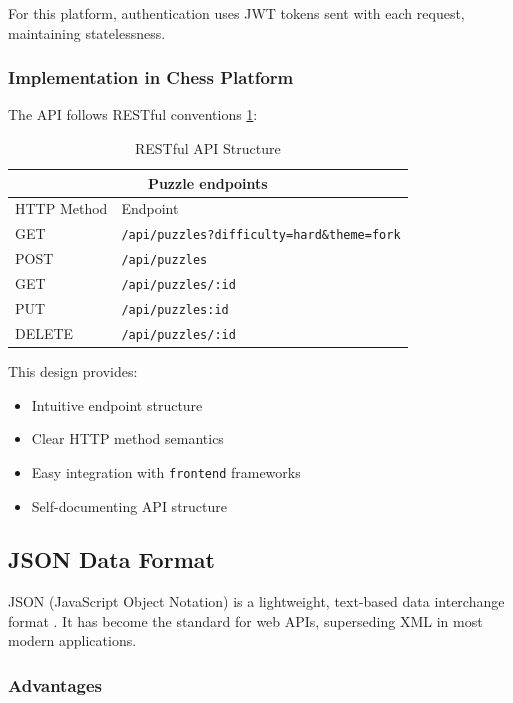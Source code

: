 For this platform, authentication uses JWT tokens sent with each request, maintaining statelessness.

\subsubsection*{Implementation in Chess Platform}

The API follows RESTful conventions \ref{table:ras}:
\begin{table}
    \begin{tabular}{|p{3cm}|p{9cm}|}
        \hline
        \multicolumn{2}{|c|}{Puzzle endpoints} \\
        \hline
        HTTP Method & Endpoint\\
        \hline
        \hline
        GET &  \texttt{/api/puzzles?difficulty=hard\&theme=fork} \\ \hline
        POST & \texttt{/api/puzzles} \\ \hline
        GET & \texttt{/api/puzzles/:id} \\ \hline
        PUT & \texttt{/api/puzzles:id} \\ \hline
        DELETE & \texttt{/api/puzzles/:id} \\ \hline
        \hline
    \end{tabular}
    \caption{RESTful API Structure}
    \label{table:ras}
\end{table}

This design provides:
\begin{itemize}
    \item Intuitive endpoint structure
    \item Clear HTTP method semantics
    \item Easy integration with \texttt{frontend} frameworks
    \item Self-documenting API structure
\end{itemize}

\subsection*{JSON Data Format}

JSON (JavaScript Object Notation) is a lightweight, text-based data interchange format \cite{crockford2006json}. It has become the standard for web APIs, superseding XML in most modern applications.

\subsubsection*{Advantages}

